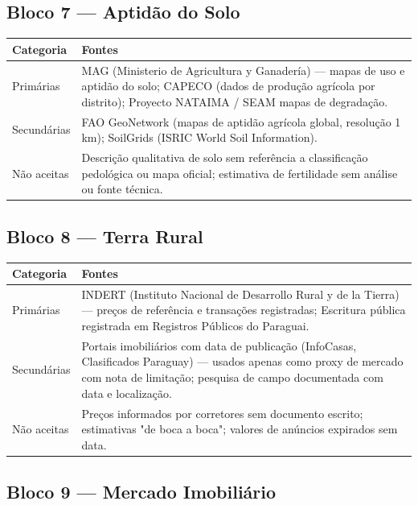 \subsection*{Bloco 7 — Aptidão do Solo}

\begin{tabularx}{\linewidth}{lX}
\toprule
\textbf{Categoria} & \textbf{Fontes} \\
\midrule
Primárias    & MAG (Ministerio de Agricultura y Ganadería) — mapas de uso e aptidão do solo; CAPECO (dados de produção agrícola por distrito); Proyecto NATAIMA / SEAM mapas de degradação. \\
Secundárias  & FAO GeoNetwork (mapas de aptidão agrícola global, resolução 1 km); SoilGrids (ISRIC World Soil Information). \\
Não aceitas  & Descrição qualitativa de solo sem referência a classificação pedológica ou mapa oficial; estimativa de fertilidade sem análise ou fonte técnica. \\
\bottomrule
\end{tabularx}

\subsection*{Bloco 8 — Terra Rural}

\begin{tabularx}{\linewidth}{lX}
\toprule
\textbf{Categoria} & \textbf{Fontes} \\
\midrule
Primárias    & INDERT (Instituto Nacional de Desarrollo Rural y de la Tierra) — preços de referência e transações registradas; Escritura pública registrada em Registros Públicos do Paraguai. \\
Secundárias  & Portais imobiliários com data de publicação (InfoCasas, Clasificados Paraguay) — usados apenas como proxy de mercado com nota de limitação; pesquisa de campo documentada com data e localização. \\
Não aceitas  & Preços informados por corretores sem documento escrito; estimativas "de boca a boca"; valores de anúncios expirados sem data. \\
\bottomrule
\end{tabularx}

\subsection*{Bloco 9 — Mercado Imobiliário}

